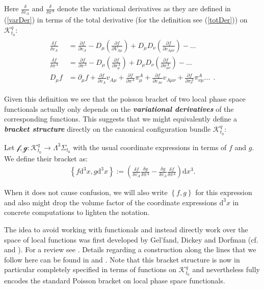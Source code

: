 Here $\frac{\delta}{\delta v_A}$ and $\frac{\delta}{\delta \pi^A}$ denote the variational derivatives as they are defined in (\ref{varDer}) in terms of the total derivative (for the definition see (\ref{totDer})) on $\mathcal{K}^q_{t_0}$:
\begin{align}
    \begin{aligned}
    \frac{\delta f}{\delta v_A} &= \frac{\partial f}{\partial v_A} - D_{\mu}(\frac{\partial f}{\partial V_{A\mu}}) + D_{\mu}D_{\nu} (\frac{\partial f}{\partial v_{A\mu\nu}}) - ... \\
    \frac{\delta f}{\delta \pi^A} &= \frac{\partial f}{\partial \pi^A} - D_{\mu}(\frac{\partial f}{\partial \pi^{A}_{\mu}}) + D_{\mu}D_{\nu} (\frac{\partial f}{\partial \pi^{A}_{\mu\nu}}) - ... \\
    D_\mu f &= \partial _\mu f + \frac{\partial f}{\partial v_A} v_{A\mu} + \frac{\partial f}{\partial \pi^A } \pi ^{A}_{ \mu} + \frac{\partial f}{\partial v_{A\nu}} v_{A\mu \nu} + \frac{\partial f}{\partial \pi^{A}_ {\nu}}\pi^{A}_{ \nu \mu} ... \ \ .
    \end{aligned}
\end{align}

Given this definition we see that the poisson bracket of two local phase space functionals actually only depends on the \textit{\textbf{variational derivatives}} of the corresponding functions. This suggests that we might equivalently define a \textit{\textbf{bracket structure}} directly on the canonical configuration bundle $\mathcal{K}^q_{t_0}$:
\begin{definition}
Let $\mathcal{f},\mathcal{g} : \mathcal{K}^q_{t_0} \rightarrow \Lambda^3\Sigma_{t_0} $ with the usual coordinate expressions in terms of $f$ and $g$. We define their bracket as: 
\begin{align}
    \left \{ f \mathrm{d}^3x,g\mathrm{d}^3x\right \} := \left ( \frac{\delta f}{\delta v_A} \frac{\delta g}{\delta \pi^A} - \frac{\delta g}{\delta v_A} \frac{\delta f}{\delta \pi^A} \right ) \mathrm{d}x^3  .
\end{align}
\end{definition}
\begin{remark}
When it does not cause confusion, we will also write $\left \{ f ,g\right \}$ for this expression and also might drop the volume factor of the coordinate expressions $\mathrm{d}^3x$ in concrete computations to lighten the notation. 
\end{remark}
The idea to avoid working with functionals and instead directly work over the space of local functions was first developed by Gel'fand, Dickey and Dorfman (cf. \cite{Gelfand1976} and \cite{Gelfand1979}). For a review see \cite{doi:10.1142/5108}.
Details regarding a construction along the lines that we follow here can be found in \cite{1997hep.th....9164B} and \cite{Barnich1998}. 
Note that this bracket structure is now in particular completely specified in terms of functions on $\mathcal{K}^q_{t_0}$ and nevertheless fully encodes the standard Poisson bracket on local phase space functionals. 

